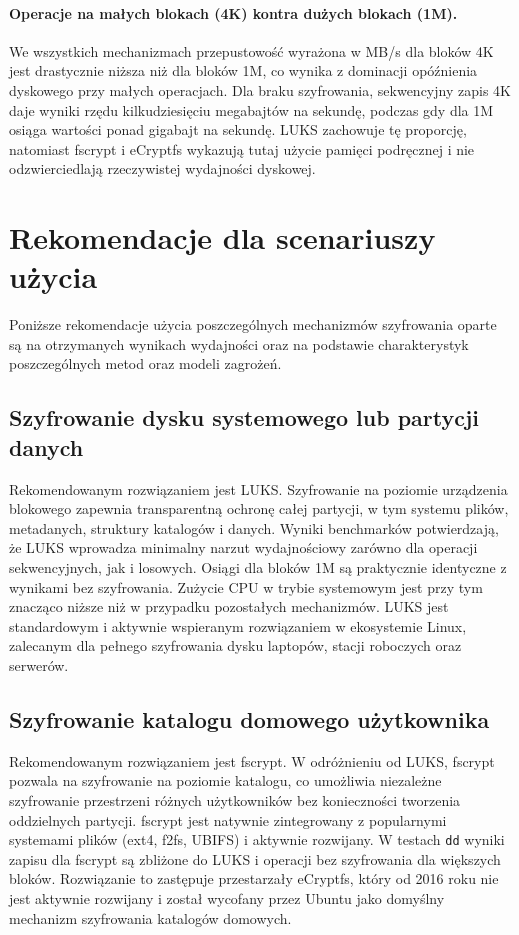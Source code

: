\documentclass[a4paper]{article}
\begin{document}
\paragraph{Operacje na małych blokach (4K) kontra dużych blokach (1M).}
We wszystkich mechanizmach przepustowość wyrażona w MB/s dla bloków 4K jest drastycznie
niższa niż dla bloków 1M, co wynika z dominacji opóźnienia dyskowego przy małych operacjach.
Dla braku szyfrowania, sekwencyjny zapis 4K daje wyniki rzędu kilkudziesięciu megabajtów na
sekundę, podczas gdy dla 1M osiąga wartości ponad gigabajt na sekundę. LUKS zachowuje tę
proporcję, natomiast fscrypt i eCryptfs wykazują tutaj użycie pamięci podręcznej i nie
odzwierciedlają rzeczywistej wydajności dyskowej.


\section{Rekomendacje dla scenariuszy użycia}

Poniższe rekomendacje użycia poszczególnych mechanizmów szyfrowania oparte są na
otrzymanych wynikach wydajności oraz na podstawie charakterystyk poszczególnych metod oraz
modeli zagrożeń.

\subsection{Szyfrowanie dysku systemowego lub partycji danych}

Rekomendowanym rozwiązaniem jest LUKS. Szyfrowanie na poziomie urządzenia blokowego
zapewnia transparentną ochronę całej partycji, w tym systemu plików, metadanych, struktury
katalogów i danych. Wyniki benchmarków potwierdzają, że LUKS wprowadza minimalny narzut
wydajnościowy zarówno dla operacji sekwencyjnych, jak i losowych. Osiągi dla bloków 1M
są praktycznie identyczne z wynikami bez szyfrowania. Zużycie CPU w trybie systemowym
jest przy tym znacząco niższe niż w przypadku pozostałych mechanizmów. LUKS jest standardowym
i aktywnie wspieranym rozwiązaniem w ekosystemie Linux, zalecanym dla pełnego szyfrowania dysku
laptopów, stacji roboczych oraz serwerów.

\subsection{Szyfrowanie katalogu domowego użytkownika}

Rekomendowanym rozwiązaniem jest fscrypt. W odróżnieniu od LUKS, fscrypt pozwala
na szyfrowanie na poziomie katalogu, co umożliwia niezależne szyfrowanie przestrzeni
różnych użytkowników bez konieczności tworzenia oddzielnych partycji. fscrypt jest natywnie
zintegrowany z popularnymi systemami plików (ext4, f2fs, UBIFS) i aktywnie rozwijany.
W testach \texttt{dd} wyniki zapisu dla fscrypt są zbliżone do LUKS i operacji bez szyfrowania
dla większych bloków. Rozwiązanie to zastępuje przestarzały eCryptfs, który od 2016 roku nie
jest aktywnie rozwijany i został wycofany przez Ubuntu jako domyślny mechanizm szyfrowania
katalogów domowych.
\end{document}
